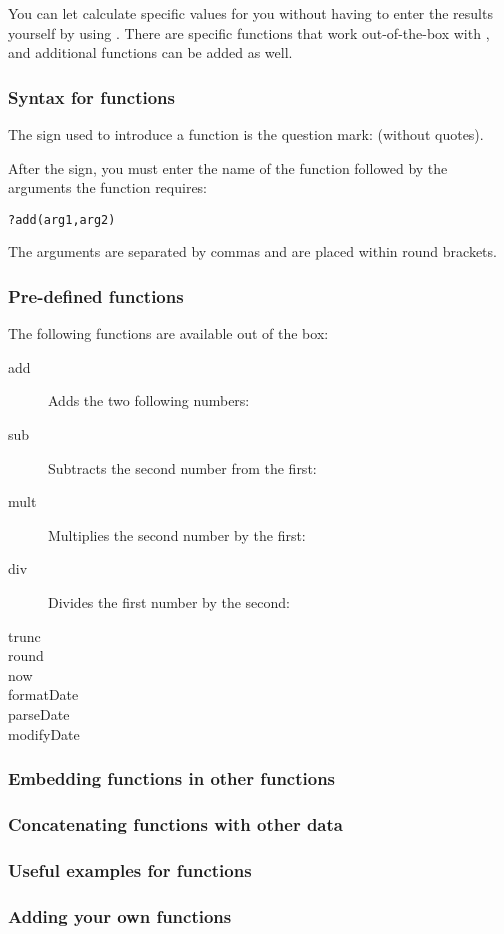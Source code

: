 
You can let \app{} calculate specific values for you without having to enter the results yourself by using . There are specific functions that work out-of-the-box with \app{}, and additional functions can be added as well. 
\subsubsection{Syntax for functions}
The sign used to introduce a function is the question mark:  (without quotes). 

After the sign, you must enter the name of the function followed by the arguments the function requires:

\verb+?add(arg1,arg2)+

The arguments are separated by commas and are placed within round brackets. 

\subsubsection{Pre-defined functions}
The following functions are available out of the box:
\begin{description}
\item [add]{Adds the two following numbers: }
\item [sub]{Subtracts the second number from the first: }
\item [mult]{Multiplies the second number by the first: }
\item [div]{Divides the first number by the second: }
\item [trunc]{}
\item [round]{}
\item [now]{}
\item [formatDate]{}
\item [parseDate]{}
\item [modifyDate]{}
\end{description}

\subsubsection{Embedding functions in other functions}

\subsubsection{Concatenating functions with other data}

\subsubsection{Useful examples for functions}

\subsubsection{Adding your own functions}


